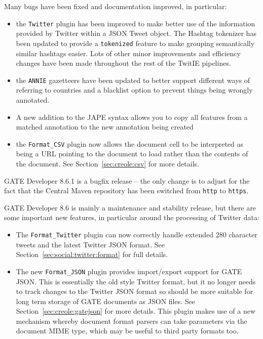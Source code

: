 Many bugs have been fixed and documentation improved, in particular:

\begin{itemize}
\item the \verb!Twitter! plugin has been improved to make better use of the information
      provided by Twitter within a JSON Tweet object. The Hashtag tokenizer has been
      updated to provide a \verb!tokenized! feature to make grouping semantically similar
      hashtags easier. Lots of other minor improvements and efficiency changes have been
      made throughout the rest of the TwitIE pipelines.
\item the \verb!ANNIE! gazetteers have been updated to better support different ways of referring
      to countries and a blacklist option to prevent things being wrongly annotated.
\item A new addition to the JAPE syntax allows you to copy all features from a matched annotation
      to the new annotation being created
\item the \verb!Format_CSV! plugin now allows the document cell to be interpreted as being
      a URL pointing to the document to load rather than the contents of the document. See
      Section~\ref{sec:creole:csv} for more details.
\end{itemize}


GATE Developer 8.6.1 is a bugfix release -- the only change is to adjust for
the fact that the Central Maven repository has been switched from \verb!http!
to \verb!https!.


GATE Developer 8.6 is mainly a maintenance and stability release, but there are
some important new features, in particular around the processing of
Twitter data:

\begin{itemize}
\item The \verb!Format_Twitter! plugin can now correctly handle extended 280
  character tweets and the latest Twitter JSON format. See
  Section~\ref{sec:social:twitter:format} for full details.
\item The new \verb!Format_JSON! plugin provides import/export support for GATE
  JSON.  This is essentially the old style Twitter format, but it no longer
  needs to track changes to the Twitter JSON format so should be more suitable
  for long term storage of GATE documents as JSON files. See
  Section~\ref{sec:creole:gatejson} for more details.  This plugin makes use of
  a new mechanism whereby document format parsers can take parameters via the
  document MIME type, which may be useful to third party formats too.
\end{itemize}


